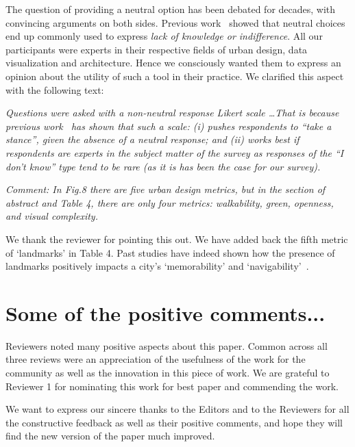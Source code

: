 \documentclass{paper}
\newenvironment{myquote}
{\definecolor{shadecolor}{rgb}{0.9,0.95,1} \begin{shaded*} \sf \em}
{\em\end{shaded*}}
\newenvironment{myquoteOrange}
{\definecolor{shadecolor}{rgb}{1,0.9,0.83} \begin{shaded*} \sf \em}
{\em\end{shaded*}}
\begin{document}
\noindent The question of providing a neutral option has been debated for decades, with convincing arguments on both sides. Previous work~\cite{Agree2012,moors2008exploring} showed that neutral choices end up commonly used to express \textit{lack of knowledge or indifference}. All our participants were experts in their respective fields of urban design, data visualization and architecture. Hence we consciously wanted them to express an opinion about the utility of such a tool in their practice. We clarified this aspect with the following text:

\begin{myquoteOrange}
Questions were asked with a non-neutral response Likert scale \ldots That is because previous work~\cite{Agree2012,moors2008exploring} has shown that such a scale: \emph{(i)} pushes respondents to ``take a stance'', given the absence of a neutral response; and \emph{(ii)} works best if respondents are experts in the subject matter of the survey as responses of the ``I don't know'' type tend to be rare (as it is has been the case for our survey).
\end{myquoteOrange}


\begin{myquote}
\noindent Comment: In Fig.8 there are five urban design metrics, but in the section of abstract and Table 4, there are only four metrics: walkability, green, openness, and visual complexity. 
\end{myquote}

\noindent We thank the reviewer for pointing this out. We have added back the fifth metric of `landmarks' in Table 4. Past studies have indeed shown how the presence of landmarks positively impacts a city's `memorability'  and `navigability'~\cite{quercia2014aesthetic,lynch1960image}.

\section*{Some of the positive comments...}

\begin{myquote}

\noindent Reviewers noted many positive aspects about this paper. Common across all three reviews were an appreciation of the usefulness of the work for the community as well as the innovation in this piece of work. We are grateful to Reviewer 1 for nominating this work for best paper and commending the work.  

\end{myquote}

We want to express our sincere thanks to the Editors and to the Reviewers for all the constructive feedback as well as their positive comments, and hope they will find the new version of the paper much improved.



\end{document}
